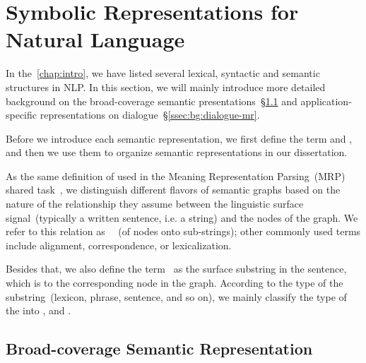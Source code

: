 \section{Symbolic Representations for Natural Language}
\label{sec:bg:symbolic}

In the~\autoref{chap:intro}, we have listed several lexical,
syntactic and semantic structures in NLP. In this section, we will
mainly introduce more detailed background on the broad-coverage
semantic presentations~\S\ref{ssec:bg:broad-mr} and
application-specific representations on
dialogue~\S\ref{ssec:bg:dialogue-mr}.

Before we introduce each semantic representation, we first define the
term  and , and then we use them to organize
semantic representations in our dissertation.

 As the same definition of  used in the
Meaning Representation Parsing~(MRP) shared
task~\citep{Oep:Abe:Haj:19}, we distinguish different flavors of
semantic graphs based on the nature of the relationship they assume
between the linguistic surface signal~(typically a written sentence,
i.e. a string) and the nodes of the graph. We refer to this relation
as ~~(of nodes onto sub-strings); other commonly used
terms include alignment, correspondence, or lexicalization.

 Besides that, we also define the term~ as
the surface substring in the sentence, which is  to
the corresponding node in the graph. According to the type of the
substring~(lexicon, phrase, sentence, and so on), we mainly classify
the type of the  into ,
 and
.

\subsection{Broad-coverage Semantic Representation}
\label{ssec:bg:broad-mr}

